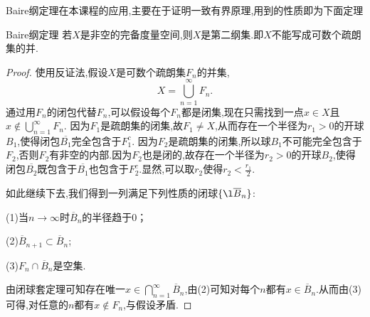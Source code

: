 \documentclass[lang=cn,18pt]{elegantbook}
\begin{document}
Baire纲定理在本课程的应用,主要在于证明一致有界原理,用到的性质即为下面定理
\begin{theorem}{Baire纲定理}
    若$X$是非空的完备度量空间,则$X$是第二纲集.即$X$不能写成可数个疏朗集的并.
\end{theorem}
\begin{proof}
    使用反证法,假设$X$是可数个疏朗集$F_n$的并集,
    $$X=\bigcup\limits_{n=1}^{\infty}F_n.$$
    通过用$F_n$的闭包代替$F_n$,可以假设每个$F_n$都是闭集,现在只需找到一点$x \in X$且$x\not\in \bigcup\limits_{n=1}^{\infty} F_n.$
    因为$F_1$是疏朗集的闭集,故$F_1 \not = X$,从而存在一个半径为$r_1 > 0$的开球$B_1$,使得闭包$\overline{B_1}$完全包含于$F_1^c.$
    因为$F_2$是疏朗集的闭集,所以球$B_1$不可能完全包含于$F_2$,否则$F_2$有非空的内部.因为$F_2$也是闭的,故存在一个半径为$r_2 > 0$的开球$B_2$,使得闭包$\overline{B_2}$既包含于$\overline{B_1}$也包含于$F_2^c$.显然,可以取$r_2$使得$r_2 <\frac{r_1}{2}.$

    如此继续下去,我们得到一列满足下列性质的闭球$\{\l\overline{B}_n\}$:

    (1)当$n\to \infty$时$\overline{B}_n$的半径趋于0；

    (2)$\overline{B}_{n+1} \subset \overline{B}_n$;

    (3)$F_n\cap \overline{B}_n$是空集.

由闭球套定理可知存在唯一$x \in \bigcap\limits_{n=1}^{\infty}\overline{B}_n$,由(2)可知对每个$n$都有$x \in \overline{B}_n$.从而由(3)可得,对任意的$n$都有$x \not\in F_n$,与假设矛盾.
\end{proof}
\end{document}
